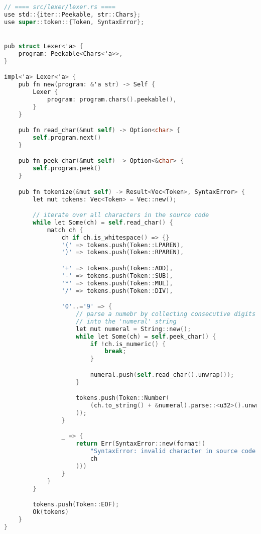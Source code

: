 \begin{lstlisting}[language={C}]
// ==== src/lexer/lexer.rs ====
use std::{iter::Peekable, str::Chars};
use super::token::{Token, SyntaxError};


pub struct Lexer<'a> {
    program: Peekable<Chars<'a>>,
}

impl<'a> Lexer<'a> {
    pub fn new(program: &'a str) -> Self {
        Lexer {
            program: program.chars().peekable(),
        }
    }

    pub fn read_char(&mut self) -> Option<char> {
        self.program.next()
    }

    pub fn peek_char(&mut self) -> Option<&char> {
        self.program.peek()
    }

    pub fn tokenize(&mut self) -> Result<Vec<Token>, SyntaxError> {
        let mut tokens: Vec<Token> = Vec::new();

        // iterate over all characters in the source code 
        while let Some(ch) = self.read_char() {
            match ch {
                ch if ch.is_whitespace() => {}
                '(' => tokens.push(Token::LPAREN),
                ')' => tokens.push(Token::RPAREN),

                '+' => tokens.push(Token::ADD),
                '-' => tokens.push(Token::SUB),
                '*' => tokens.push(Token::MUL),
                '/' => tokens.push(Token::DIV),

                '0'..='9' => {
                    // parse a numebr by collecting consecutive digits in the source code 
                    // into the 'numeral' string
                    let mut numeral = String::new();
                    while let Some(ch) = self.peek_char() {
                        if !ch.is_numeric() {
                            break;
                        }

                        numeral.push(self.read_char().unwrap());
                    }

                    tokens.push(Token::Number(
                        (ch.to_string() + &numeral).parse::<u32>().unwrap(),
                    ));
                }

                _ => {
                    return Err(SyntaxError::new(format!(
                        "SyntaxError: invalid character in source code '{}'",
                        ch
                    )))
                }
            }
        }

        tokens.push(Token::EOF);
        Ok(tokens)
    }
}
\end{lstlisting}

